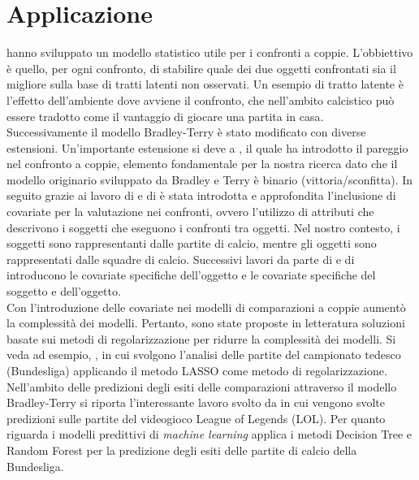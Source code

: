 \section{Applicazione}
\textcite{bradley1952rank} hanno sviluppato un modello statistico utile per i confronti a coppie. L'obbiettivo è quello, per ogni confronto, di stabilire quale dei due oggetti confrontati sia il migliore sulla base di tratti latenti non osservati. Un esempio di tratto latente è l'effetto dell'ambiente dove avviene il confronto, che nell'ambito calcistico può essere tradotto come il vantaggio di giocare una partita in casa. \\
Successivamente il modello Bradley-Terry è stato modificato con diverse estensioni. Un'importante estensione si deve a \textcite{davidson1970extending}, il quale ha introdotto il pareggio nel confronto a coppie, elemento fondamentale per la nostra ricerca dato che il modello originario sviluppato da Bradley e Terry è binario (vittoria/sconfitta). In seguito grazie ai lavoro di \textcite{francis2010} e di \textcite{Turner2012Firth} è stata introdotta e approfondita l'inclusione di covariate per la valutazione nei confronti, ovvero l'utilizzo di attributi che descrivono i soggetti che eseguono i confronti tra oggetti. Nel nostro contesto, i soggetti sono rappresentanti dalle partite di calcio, mentre gli oggetti sono rappresentati dalle squadre di calcio. Successivi lavori da parte di \textcite{thurner2000policy} e di \textcite{mauerer2015modeling} introducono le covariate specifiche dell'oggetto e le covariate specifiche del soggetto e dell'oggetto.\\ %
Con l'introduzione delle covariate nei modelli di comparazioni a coppie aumentò la complessità dei modelli. Pertanto, sono state proposte in letteratura soluzioni basate sui metodi di regolarizzazione per ridurre la complessità dei modelli. Si veda ad esempio, \textcite{schauberger2019btllasso}, in cui svolgono l'analisi delle partite del campionato tedesco (Bundesliga) applicando il metodo LASSO come metodo di regolarizzazione.\\
Nell'ambito delle predizioni degli esiti delle comparazioni attraverso il modello Bradley-Terry si riporta l’interessante lavoro svolto da \textcite{kang2015poisson} in cui vengono svolte predizioni sulle partite del videogioco League of Legends (LOL). Per quanto riguarda i modelli predittivi di \emph{machine learning} \textcite{xu2021prediction} applica i metodi Decision Tree e Random Forest per la predizione degli esiti delle partite di calcio della Bundesliga.

